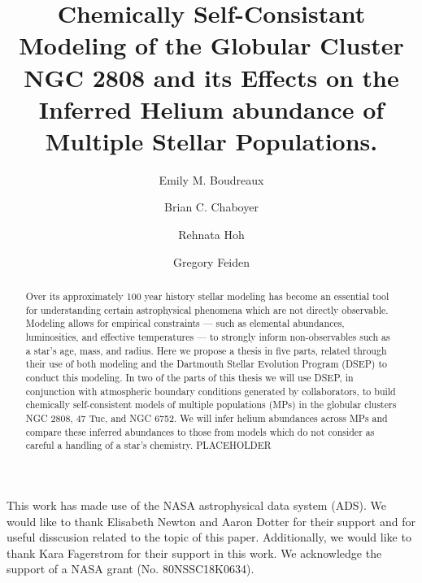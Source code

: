 \documentclass[twocolumn,linenumbers]{src/aastex631}
\begin{document}
\title{Chemically Self-Consistant Modeling of the Globular Cluster NGC 2808 and its Effects on the Inferred Helium abundance of Multiple Stellar Populations.}


\author[0000-0002-2600-7513]{Emily M. Boudreaux}

\author[0000-0003-3096-4161]{Brian C. Chaboyer}

\author{Rehnata Hoh}

\author[0000-0002-2012-7215]{Gregory Feiden}


\begin{abstract}
	Over its approximately 100 year history stellar modeling has become an
	essential tool for understanding certain astrophysical phenomena which are not
	directly observable. Modeling allows for empirical constraints --- such as
	elemental abundances, luminosities, and effective temperatures --- to strongly
	inform non-observables such as a star's age, mass, and radius. Here we propose a
	thesis in five parts, related through their use of both modeling and the
	Dartmouth Stellar Evolution Program (DSEP) to conduct this modeling. In two of
	the parts of this thesis we will use DSEP, in conjunction with atmospheric
	boundary conditions generated by collaborators, to build chemically
	self-consistent models of multiple populations (MPs) in the globular clusters
	NGC 2808, 47 Tuc, and NGC 6752. We will infer helium abundances across MPs and
	compare these inferred abundances to those from models which do not consider as
	careful a handling of a star's chemistry. PLACEHOLDER
\end{abstract}

\keywords{}








\begin{acknowledgments}
	This work has made use of the NASA astrophysical data system (ADS). We
	would like to thank Elisabeth Newton and Aaron Dotter for their support and
	for useful disscusion related to the topic of this paper. Additionally, we
	would like to thank Kara Fagerstrom for their support in this work. We
	acknowledge the support of a NASA grant (No. 80NSSC18K0634). 
\end{acknowledgments}



{}

\end{document}
